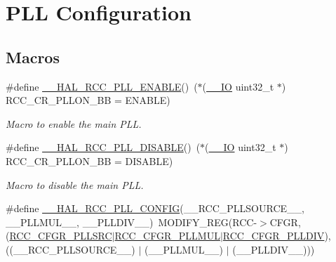 \hypertarget{group___r_c_c___p_l_l___configuration}{\section{P\-L\-L Configuration}
\label{group___r_c_c___p_l_l___configuration}
}
\subsection*{Macros}
\begin{DoxyCompactItemize}
\item 
\#define \hyperlink{group___r_c_c___p_l_l___configuration_gaaf196a2df41b0bcbc32745c2b218e696}{\-\_\-\-\_\-\-H\-A\-L\-\_\-\-R\-C\-C\-\_\-\-P\-L\-L\-\_\-\-E\-N\-A\-B\-L\-E}()~($\ast$(\hyperlink{core__sc300_8h_aec43007d9998a0a0e01faede4133d6be}{\-\_\-\-\_\-\-I\-O} uint32\-\_\-t $\ast$) R\-C\-C\-\_\-\-C\-R\-\_\-\-P\-L\-L\-O\-N\-\_\-\-B\-B = E\-N\-A\-B\-L\-E)
\begin{DoxyCompactList}\small\item\em Macro to enable the main P\-L\-L. \end{DoxyCompactList}\item 
\#define \hyperlink{group___r_c_c___p_l_l___configuration_ga718a6afcb1492cc2796be78445a7d5ab}{\-\_\-\-\_\-\-H\-A\-L\-\_\-\-R\-C\-C\-\_\-\-P\-L\-L\-\_\-\-D\-I\-S\-A\-B\-L\-E}()~($\ast$(\hyperlink{core__sc300_8h_aec43007d9998a0a0e01faede4133d6be}{\-\_\-\-\_\-\-I\-O} uint32\-\_\-t $\ast$) R\-C\-C\-\_\-\-C\-R\-\_\-\-P\-L\-L\-O\-N\-\_\-\-B\-B = D\-I\-S\-A\-B\-L\-E)
\begin{DoxyCompactList}\small\item\em Macro to disable the main P\-L\-L. \end{DoxyCompactList}\item 
\#define \hyperlink{group___r_c_c___p_l_l___configuration_ga2145b44e05d90ad3ff43653ee98cbba7}{\-\_\-\-\_\-\-H\-A\-L\-\_\-\-R\-C\-C\-\_\-\-P\-L\-L\-\_\-\-C\-O\-N\-F\-I\-G}(\-\_\-\-\_\-\-R\-C\-C\-\_\-\-P\-L\-L\-S\-O\-U\-R\-C\-E\-\_\-\-\_\-, \-\_\-\-\_\-\-P\-L\-L\-M\-U\-L\-\_\-\-\_\-, \-\_\-\-\_\-\-P\-L\-L\-D\-I\-V\-\_\-\-\_\-)~M\-O\-D\-I\-F\-Y\-\_\-\-R\-E\-G(R\-C\-C-\/$>$C\-F\-G\-R, (\hyperlink{group___peripheral___registers___bits___definition_gaba4a5dbbd286f07a97f5aa6e6f3f6a57}{R\-C\-C\-\_\-\-C\-F\-G\-R\-\_\-\-P\-L\-L\-S\-R\-C}$\vert$\hyperlink{group___peripheral___registers___bits___definition_ga538fd5df8d890696483a0e901d739309}{R\-C\-C\-\_\-\-C\-F\-G\-R\-\_\-\-P\-L\-L\-M\-U\-L}$\vert$\hyperlink{group___peripheral___registers___bits___definition_gad6d1731e7b6bfda6962dcef892cfdede}{R\-C\-C\-\_\-\-C\-F\-G\-R\-\_\-\-P\-L\-L\-D\-I\-V}),((\-\_\-\-\_\-\-R\-C\-C\-\_\-\-P\-L\-L\-S\-O\-U\-R\-C\-E\-\_\-\-\_\-) $\vert$ (\-\_\-\-\_\-\-P\-L\-L\-M\-U\-L\-\_\-\-\_\-) $\vert$ (\-\_\-\-\_\-\-P\-L\-L\-D\-I\-V\-\_\-\-\_\-)))

\end{DoxyCompactItemize}
